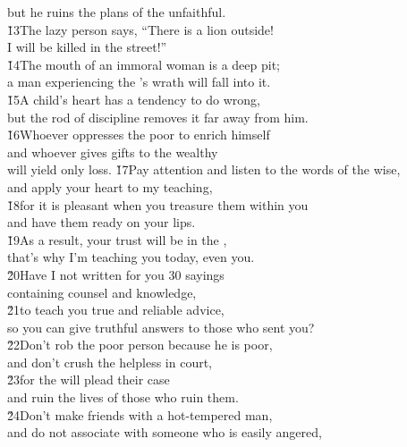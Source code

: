 \begin{poetry}
\poemll    but he ruins the plans of the unfaithful. \\
\poeml \v{13}The lazy person says, ``There is a lion outside! \\
\poemll    I will be killed in the street!'' \\
\poeml \v{14}The mouth of an immoral woman is a deep pit; \\
\poemll    a man experiencing the 's wrath will fall into it. \\
\poeml \v{15}A child's heart has a tendency to do wrong, \\
\poemll    but the rod of discipline removes it far away from him. \\
\poeml \v{16}Whoever oppresses the poor to enrich himself \\
\poemll    and whoever gives gifts to the wealthy \\
\poemlll       will yield only loss.
\poeml \v{17}Pay attention and listen to the words of the wise, \\
\poemll    and apply your heart to my teaching, \\
\poeml \v{18}for it is pleasant when you treasure them within you \\
\poemll    and have them ready on your lips. \\
\poeml \v{19}As a result, your trust will be in the , \\
\poemll    that's why I'm teaching you today, even you. \\
\poeml \v{20}Have I not written for you 30 sayings \\
\poemll    containing counsel and knowledge, \\
\poeml \v{21}to teach you true and reliable advice, \\
\poemll    so you can give truthful answers to those who sent you? \\
\poeml \v{22}Don't rob the poor person because he is poor, \\
\poemll    and don't crush the helpless in court, \\
\poeml \v{23}for the  will plead their case \\
\poemll    and ruin the lives of those who ruin them. \\
\poeml \v{24}Don't make friends with a hot-tempered man, \\
\poemll    and do not associate with someone who is easily angered, \\

\end{poetry}
